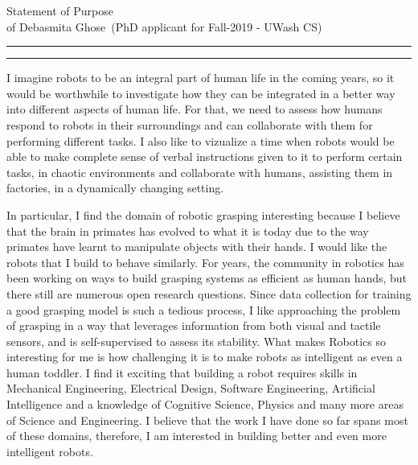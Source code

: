 \documentclass[11pt]{article}
\newcommand{\soptitle}{Statement of Purpose}
\newcommand{\yourname}{Debasmita Ghose}
\begin{document}
\begin{center}\LARGE\soptitle\\
\large of \yourname\ (PhD applicant for Fall-2019 - UWash CS)
\end{center}

\hrule
\vspace{0pt}
\hrule height 1pt

\justify

I imagine robots to be an integral part of human life in the coming years, so it would be worthwhile to investigate how they can be integrated in a better way into different aspects of human life. For that, we need to assess how humans respond to robots in their surroundings and can collaborate with them for performing different tasks. I also like to vizualize a time when robots would be able to make complete sense of verbal instructions given to it to perform certain tasks, in chaotic environments and collaborate with humans, assisting them in factories, in a dynamically changing setting.
\par
\justify
  In particular, I find the domain of robotic grasping interesting because I believe that the brain in primates has evolved to what it is today due to the way primates have learnt to manipulate objects with their hands. I would like the robots that I build to behave similarly. For years, the community in robotics has been working on ways to build grasping systems as efficient as  human hands, but there still are numerous open research questions. Since data collection for training a good grasping model is such a tedious process,  I like approaching the problem of grasping in a way that leverages information from both visual and tactile sensors, and is self-supervised to assess its stability. What makes Robotics so interesting for me is how challenging it is to make robots as intelligent as even a human toddler. I find it exciting that building a robot requires skills in Mechanical Engineering, Electrical Design, Software Engineering, Artificial Intelligence and a knowledge of Cognitive Science, Physics and many more areas of Science and Engineering. I believe that the work I have done so far spans most of these domains, therefore, I am interested in building better and even more intelligent robots.    
\par
\justify
\end{document}
